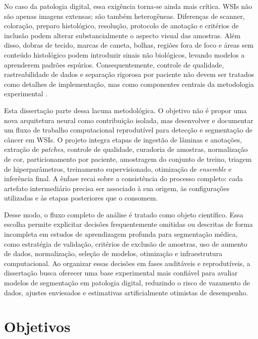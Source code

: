 No caso da patologia digital, essa exigência torna-se ainda mais crítica. WSIs não são apenas imagens extensas; são também heterogêneas. Diferenças de scanner, coloração, preparo histológico, resolução, protocolo de anotação e critérios de inclusão podem alterar substancialmente o aspecto visual das amostras. Além disso, dobras de tecido, marcas de caneta, bolhas, regiões fora de foco e áreas sem conteúdo histológico podem introduzir sinais não biológicos, levando modelos a aprenderem padrões espúrios. Consequentemente, controle de qualidade, rastreabilidade de dados e separação rigorosa por paciente não devem ser tratados como detalhes de implementação, mas como componentes centrais da metodologia experimental \cite{weng2024grandqc,dawood2026confounding,wilkinson2016fair}.

Esta dissertação parte dessa lacuna metodológica. O objetivo não é propor uma nova arquitetura neural como contribuição isolada, mas desenvolver e documentar um fluxo de trabalho computacional reprodutível para detecção e segmentação de câncer em WSIs. O projeto integra etapas de ingestão de lâminas e anotações, extração de \textit{patches}, controle de qualidade, curadoria de amostras, normalização de cor, particionamento por paciente, amostragem do conjunto de treino, triagem de hiperparâmetros, treinamento supervisionado, otimização de \textit{ensemble} e inferência final. A ênfase recai sobre a consistência do processo completo: cada artefato intermediário precisa ser associado à sua origem, às configurações utilizadas e às etapas posteriores que o consomem.

Desse modo, o fluxo completo de análise é tratado como objeto científico. Essa escolha permite explicitar decisões frequentemente omitidas ou descritas de forma incompleta em estudos de aprendizagem profunda para segmentação médica, como estratégia de validação, critérios de exclusão de amostras, uso de aumento de dados, normalização, seleção de modelos, otimização e infraestrutura computacional. Ao organizar essas decisões em fases auditáveis e reprodutíveis, a dissertação busca oferecer uma base experimental mais confiável para
avaliar modelos de segmentação em patologia digital, reduzindo o risco de
vazamento de dados, ajustes enviesados e
estimativas artificialmente otimistas de desempenho.

\section{Objetivos}\label{sec:objetivos}

